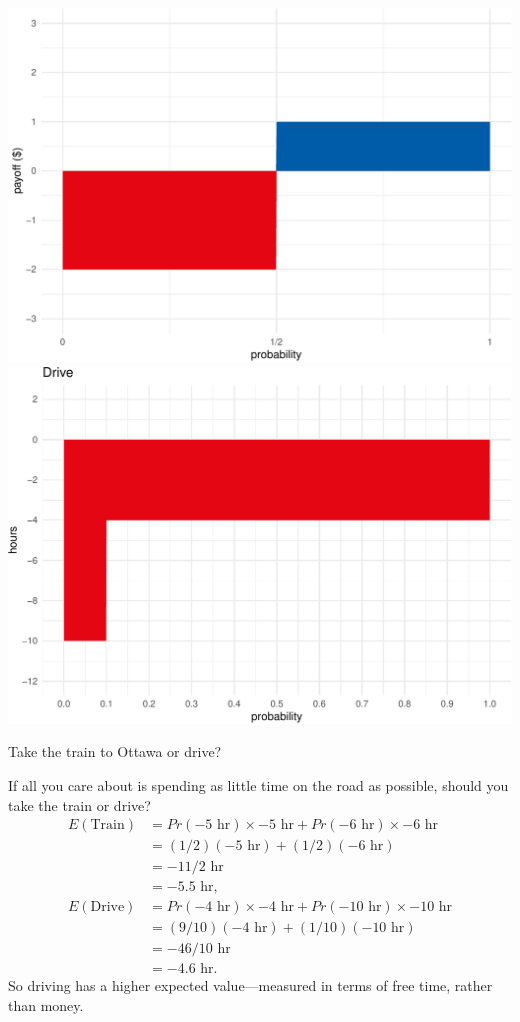 \documentclass[justified]{tufte-book}
\newcommand{\p}{Pr}
\newcommand{\E}{E}
\theoremstyle{definition}
\theoremstyle{definition}
\theoremstyle{definition}
\theoremstyle{remark}
\begin{document}
\begin{marginfigure}
\includegraphics{_main_files/figure-latex/unnamed-chunk-94-1} \includegraphics{_main_files/figure-latex/unnamed-chunk-94-2} \caption[Take the train to Ottawa or drive?]{Take the train to Ottawa or drive?}\label{fig:unnamed-chunk-94}
\end{marginfigure}

If all you care about is spending as little time on the road as
possible, should you take the train or drive? \[
  \begin{aligned}
    \E(\mbox{Train}) &= \p(-5{\mbox{ hr}}) \times -5{\mbox{ hr}}+ \p(-6{\mbox{ hr}}) \times -6{\mbox{ hr}}\\
                     &= (1/2)(-5{\mbox{ hr}}) + (1/2)(-6{\mbox{ hr}})\\
                     &= -11/2{\mbox{ hr}}\\
                     &= -5.5{\mbox{ hr}},\\
    \E(\mbox{Drive}) &= \p(-4{\mbox{ hr}}) \times -4{\mbox{ hr}}+ \p(-10{\mbox{ hr}}) \times -10{\mbox{ hr}}\\
                     &= (9/10)(-4{\mbox{ hr}}) + (1/10)(-10{\mbox{ hr}})\\
                     &= -46/10{\mbox{ hr}}\\
                     &= -4.6{\mbox{ hr}}.
  \end{aligned}
\] So driving has a higher expected value---measured in terms of free
time, rather than money.
\end{document}
